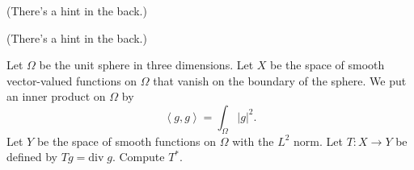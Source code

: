\documentclass[minion]{homework}
\begin{document}
\begin{aproblems}





 (There's a hint in the back.)

 (There's a hint in the back.)



\hproblem Let $\Omega$ be the unit sphere in three dimensions.
Let $X$ be the space of smooth vector-valued functions on $\Omega$
that vanish
on the boundary of the sphere.  We put an inner product on $\Omega$ by
\[
\left<g,g\right> = \int_{\Omega} |g|^2.
\]
Let $Y$ be the space of smooth functions
on $\Omega$ with the $L^2$ norm.  Let $T:X\rightarrow Y$ be defined by $T g = \mathrm{div}\; g$.
Compute $T^*$.

\end{aproblems}
\end{document}
